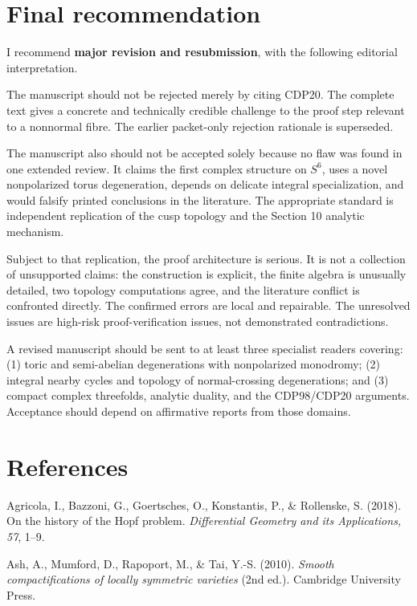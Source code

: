 \documentclass[
  10pt,
  letterpaper,
]{article}
\begin{document}
\section{Final recommendation}\label{final-recommendation}

I recommend \textbf{major revision and resubmission}, with the following
editorial interpretation.

The manuscript should not be rejected merely by citing CDP20. The
complete text gives a concrete and technically credible challenge to the
proof step relevant to a nonnormal fibre. The earlier packet-only
rejection rationale is superseded.

The manuscript also should not be accepted solely because no flaw was
found in one extended review. It claims the first complex structure on
\(S^6\), uses a novel nonpolarized torus degeneration, depends on
delicate integral specialization, and would falsify printed conclusions
in the literature. The appropriate standard is independent replication
of the cusp topology and the Section 10 analytic mechanism.

Subject to that replication, the proof architecture is serious. It is
not a collection of unsupported claims: the construction is explicit,
the finite algebra is unusually detailed, two topology computations
agree, and the literature conflict is confronted directly. The confirmed
errors are local and repairable. The unresolved issues are high-risk
proof-verification issues, not demonstrated contradictions.

A revised manuscript should be sent to at least three specialist readers
covering: (1) toric and semi-abelian degenerations with nonpolarized
monodromy; (2) integral nearby cycles and topology of normal-crossing
degenerations; and (3) compact complex threefolds, analytic duality, and
the CDP98/CDP20 arguments. Acceptance should depend on affirmative
reports from those domains.

\section{References}\label{references}

Agricola, I., Bazzoni, G., Goertsches, O., Konstantis, P., \& Rollenske,
S. (2018). On the history of the Hopf problem. \emph{Differential
Geometry and its Applications, 57}, 1--9.

Ash, A., Mumford, D., Rapoport, M., \& Tai, Y.-S. (2010). \emph{Smooth
compactifications of locally symmetric varieties} (2nd ed.). Cambridge
University Press.
\end{document}
